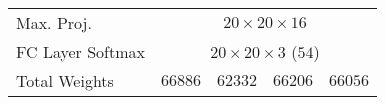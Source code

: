 \documentclass[twocolumn,final]{article}
\newcommand{\shortTimes}{\! {\times} \!}
\newlength{\cellWidth}   \setlength{\cellWidth}{0.14\columnwidth}
\begin{document}
\begin{table}[ht!]
\begin{tabular}{p{} || p{\cellWidth} p{\cellWidth} p{\cellWidth} p{\cellWidth}}
\scriptsize \centering Max. Proj.
& \multicolumn{4}{c}{ \scriptsize $20 \shortTimes 20 \shortTimes 16$ }
\\

\scriptsize \centering FC Layer \newline Softmax 
& \multicolumn{4}{c}{ \scriptsize $20 \shortTimes 20 \shortTimes 3$ ($54$) }
\\\hline

\scriptsize \centering Total \newline Weights
& \multicolumn{1}{c}{ \scriptsize $66886$}
& \multicolumn{1}{c}{ \scriptsize $62332$ }
& \multicolumn{1}{c}{ \scriptsize $66206$ }
& \multicolumn{1}{c}{ \scriptsize $66056$ }

\end{tabular}
\label{tab:nucleiArchitecture} 
\end{table}
\end{document}
